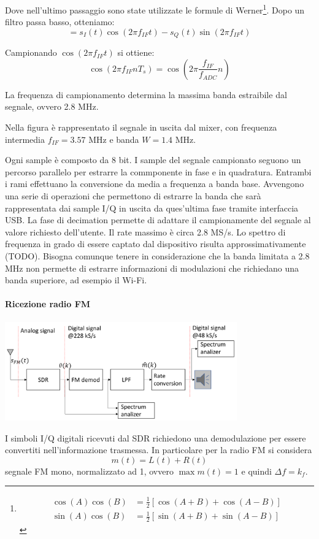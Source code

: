 Dove nell'ultimo passaggio sono state utilizzate le formule di Werner\footnote{\[
\begin{aligned}
    \cos(A)\cos(B) & = \frac{1}{2}[\cos(A+B) + \cos(A-B)] \\
    \sin(A)\cos(B) & = \frac{1}{2}[\sin(A+B) + \sin(A-B)]
\end{aligned}
\]
}. Dopo un filtro passa basso, otteniamo:
\[
= s_I(t) \cos (2 \pi f_{IF} t) - s_Q(t) \sin (2 \pi f_{IF} t)
\]





Campionando $\cos(2\pi f_{IF} t)$ si ottiene:
\[
    \cos(2\pi f_{IF} n T_s) = \cos(2\pi \frac{f_{IF}}{f_{ADC}} n)
\]

La frequenza di campionamento determina la massima banda estraibile dal segnale, ovvero 2.8 MHz.

\begin{center}
    
\end{center}
Nella figura è rappresentato il segnale in uscita dal mixer, con frequenza intermedia $f_{IF} = 3.57$ MHz e banda $W = 1.4$ MHz.

Ogni sample è composto da 8 bit. I sample del segnale campionato seguono un percorso parallelo per estrarre la commponente in fase e in quadratura. Entrambi i rami effettuano la conversione da media a frequenza a banda base.
Avvengono una serie di operazioni che permettono di estrarre la banda che sarà rappresentata dai sample I/Q in uscita da ques'ultima fase tramite interfaccia USB.
La fase di decimation permette di adattare il campionamente  del segnale al valore richiesto dell'utente. Il rate massimo è circa 2.8 MS/s.
Lo spettro di frequenza in grado di essere captato dal dispositivo risulta approssimativamente (TODO).
Bisogna comunque tenere in considerazione che la banda limitata a 2.8 MHz non permette di estrarre informazioni di modulazioni che richiedano una banda superiore, ad esempio il Wi-Fi.


\paragraph*{Ricezione radio FM}
\begin{center}
    \includegraphics[width=0.75\textwidth]{imgs/fm_receiver_impl.jpg}
\end{center}
I simboli I/Q digitali ricevuti dal SDR richiedono una demodulazione per essere convertiti nell'informazione trasmessa. In particolare per la radio FM si considera
\[
    m(t) = L(t) + R(t)
\]
segnale FM mono, normalizzato ad 1, ovvero $\max{m(t)} = 1$ e quindi $\Delta f = k_f$.


